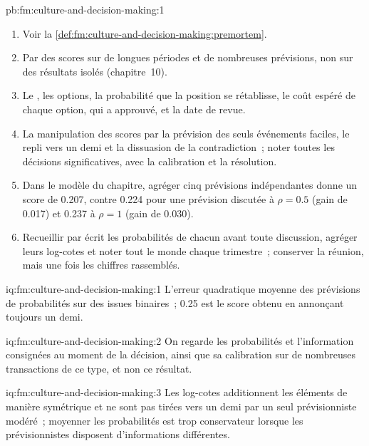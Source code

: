 \begin{solution}{pb:fm:culture-and-decision-making:1}
\begin{enumerate}
77.7~\%.
\item Voir la \cref{def:fm:culture-and-decision-making:premortem}.
\item Par des scores sur de longues périodes et de nombreuses prévisions, non sur des résultats isolés (chapitre~10).
\item Le , les options, la probabilité que la position se rétablisse, le coût espéré de chaque option, qui a approuvé, et la date de revue.
\item La manipulation des scores par la prévision des seuls événements faciles, le repli vers un demi et la dissuasion de la contradiction~; noter toutes les décisions significatives, avec
la calibration et la résolution.
\item Dans le modèle du chapitre, agréger cinq prévisions indépendantes donne un score de 0.207, contre 0.224 pour une prévision discutée à $\rho=0.5$ (gain de
0.017) et 0.237 à $\rho=1$ (gain de 0.030).
\item Recueillir par écrit les probabilités de chacun avant toute discussion, agréger leurs log-cotes et noter tout le monde chaque trimestre~; conserver la
réunion, mais une fois les chiffres rassemblés.
\end{enumerate}
\end{solution}

\begin{solution}{iq:fm:culture-and-decision-making:1}
L'erreur quadratique moyenne des prévisions de probabilités sur des issues binaires~; 0.25 est le score obtenu en annonçant toujours un demi.
\end{solution}

\begin{solution}{iq:fm:culture-and-decision-making:2}
On regarde les probabilités et l'information consignées au moment de la décision, ainsi que sa calibration sur de nombreuses transactions de ce type, et non ce résultat.
\end{solution}

\begin{solution}{iq:fm:culture-and-decision-making:3}
Les log-cotes additionnent les éléments de manière symétrique et ne sont pas tirées vers un demi par un seul prévisionniste modéré~; moyenner les probabilités est trop
conservateur lorsque les prévisionnistes disposent d'informations différentes.
\end{solution}


